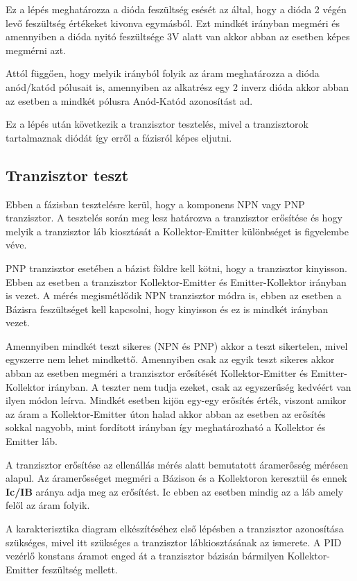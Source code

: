 Ez a lépés meghatározza a dióda feszültség esését az által, hogy a 
dióda 2 végén levő feszültség értékeket kivonva egymásból.
Ezt mindkét irányban megméri és amennyiben a dióda nyitó
feszültsége 3V alatt van akkor abban az esetben képes megmérni azt.

Attól függően, hogy melyik irányból folyik az áram meghatározza
a dióda anód/katód pólusait is, amennyiben az alkatrész egy 
2 inverz dióda akkor abban az esetben a mindkét pólusra 
Anód-Katód azonosítást ad.

Ez a lépés után következik a tranzisztor tesztelés, mivel a
tranzisztorok tartalmaznak diódát így erről a fázisról képes eljutni.

\subsection{Tranzisztor teszt}

Ebben a fázisban tesztelésre kerül, hogy a komponens NPN vagy PNP tranzisztor.
A tesztelés során meg lesz határozva a tranzisztor erősítése és hogy 
melyik a tranzisztor láb kiosztását a Kollektor-Emitter különbséget is figyelembe
véve.

PNP tranzisztor esetében a bázist földre kell kötni, hogy a tranzisztor kinyisson.
Ebben az esetben a tranzisztor Kollektor-Emitter és Emitter-Kollektor irányban
is vezet. A mérés megismétlődik NPN tranzisztor módra is, ebben az esetben 
a Bázisra feszültséget kell kapcsolni, hogy kinyisson és ez is mindkét irányban
vezet.

Amennyiben mindkét teszt sikeres (NPN és PNP) akkor a teszt sikertelen, mivel
egyszerre nem lehet mindkettő. Amennyiben csak az egyik teszt sikeres akkor
abban az esetben megméri a tranzisztor erősítését Kollektor-Emitter és 
Emitter-Kollektor irányban. A teszter nem tudja ezeket, csak az egyszerűség
kedvéért van ilyen módon leírva. Mindkét esetben kijön egy-egy erősítés érték,
viszont amikor az áram a Kollektor-Emitter úton halad akkor abban az esetben
az erősítés sokkal nagyobb, mint fordított irányban így meghatározható a 
Kollektor és Emitter láb.

A tranzisztor erősítése az ellenállás mérés alatt bemutatott áramerősség
mérésen alapul. Az áramerősséget megméri a Bázison és a Kollektoron keresztül
és ennek \textbf{Ic/IB} aránya adja meg az erősítést. Ic ebben az esetben mindig
az a láb amely felől az áram folyik.

A karakterisztika diagram elkészítéséhez első lépésben a tranzisztor azonosítása
szükséges, mivel itt szükséges a tranzisztor lábkiosztásának az ismerete.
A PID vezérlő konstans áramot enged át a tranzisztor bázisán bármilyen
Kollektor-Emitter feszültség mellett. 

